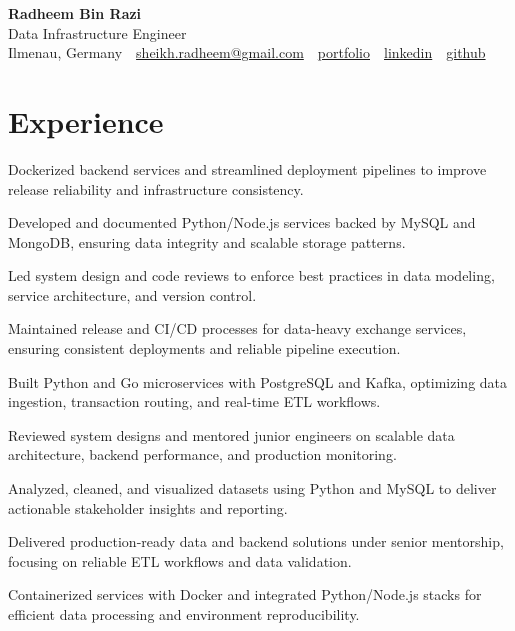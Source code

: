 \documentclass[11pt,a4paper]{resume}
\makeatletter
\newcommand{\Portfolio}{https://radheem.github.io/my-cv}
\newcommand{\PortfolioText}{portfolio}
\newcommand{\GitHub}{https://github.com/radheem}
\newcommand{\LinkedIn}{https://www.linkedin.com/in/radheem-razi}
\newcommand{\Email}{sheikh.radheem@gmail.com}
\makeatother
\begin{document}
\begin{center}
  {\huge\bfseries Radheem Bin Razi}\\[3pt]
  {\large Data Infrastructure Engineer}\\[6pt]
  \small
  Ilmenau, Germany \,\textbar\,
  \href{mailto:\Email}{\Email} \,\textbar\,
  \href{\Portfolio}{\PortfolioText} \,\textbar\,
  \href{\LinkedIn}{linkedin} \,\textbar\,
  \href{\GitHub}{github}
\end{center}
\vspace{2pt}

\section{Experience}

\bullets
  \item Dockerized backend services and streamlined deployment pipelines to improve release reliability and infrastructure consistency.
  \item Developed and documented Python/Node.js services backed by MySQL and MongoDB, ensuring data integrity and scalable storage patterns.
  \item Led system design and code reviews to enforce best practices in data modeling, service architecture, and version control.
\bulletsend
\vspace{3pt}
\bullets
  \item Maintained release and CI/CD processes for data-heavy exchange services, ensuring consistent deployments and reliable pipeline execution.
  \item Built Python and Go microservices with PostgreSQL and Kafka, optimizing data ingestion, transaction routing, and real-time ETL workflows.
  \item Reviewed system designs and mentored junior engineers on scalable data architecture, backend performance, and production monitoring.
\bulletsend
\vspace{3pt}
\bullets
  \item Analyzed, cleaned, and visualized datasets using Python and MySQL to deliver actionable stakeholder insights and reporting.
  \item Delivered production-ready data and backend solutions under senior mentorship, focusing on reliable ETL workflows and data validation.
  \item Containerized services with Docker and integrated Python/Node.js stacks for efficient data processing and environment reproducibility.
\bulletsend
\vspace{3pt}
\end{document}
